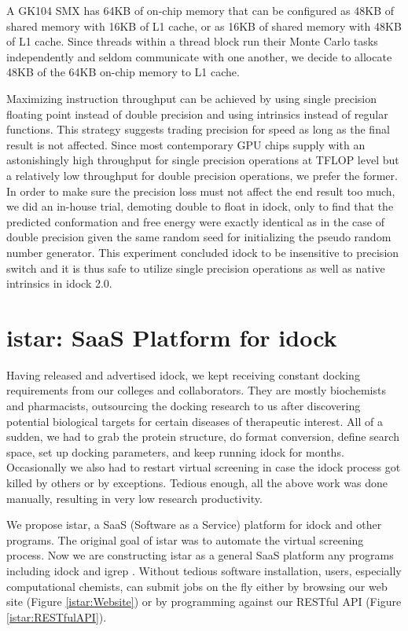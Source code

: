 A GK104 SMX has 64KB of on-chip memory that can be configured as 48KB of shared memory with 16KB of L1 cache, or as 16KB of shared memory with 48KB of L1 cache. Since threads within a thread block run their Monte Carlo tasks independently and seldom communicate with one another, we decide to allocate 48KB of the 64KB on-chip memory to L1 cache.

Maximizing instruction throughput can be achieved by using single precision floating point instead of double precision and using intrinsics instead of regular functions. This strategy suggests trading precision for speed as long as the final result is not affected. Since most contemporary GPU chips supply with an astonishingly high throughput for single precision operations at TFLOP level but a relatively low throughput for double precision operations, we prefer the former. In order to make sure the precision loss must not affect the end result too much, we did an in-house trial, demoting double to float in idock, only to find that the predicted conformation and free energy were exactly identical as in the case of double precision given the same random seed for initializing the pseudo random number generator. This experiment concluded idock to be insensitive to precision switch and it is thus safe to utilize single precision operations as well as native intrinsics in idock 2.0.

\section{istar: SaaS Platform for idock}

Having released and advertised idock, we kept receiving constant docking requirements from our colleges and collaborators. They are mostly biochemists and pharmacists, outsourcing the docking research to us after discovering potential biological targets for certain diseases of therapeutic interest. All of a sudden, we had to grab the protein structure, do format conversion, define search space, set up docking parameters, and keep running idock for months. Occasionally we also had to restart virtual screening in case the idock process got killed by others or by exceptions. Tedious enough, all the above work was done manually, resulting in very low research productivity.

We propose istar, a SaaS (Software as a Service) platform for idock and other programs. The original goal of istar was to automate the virtual screening process. Now we are constructing istar as a general SaaS platform any programs including idock \citep{1153} and igrep \citep{1138}. Without tedious software installation, users, especially computational chemists, can submit jobs on the fly either by browsing our web site (Figure \ref{istar:Website}) or by programming against our RESTful API (Figure \ref{istar:RESTfulAPI}).

